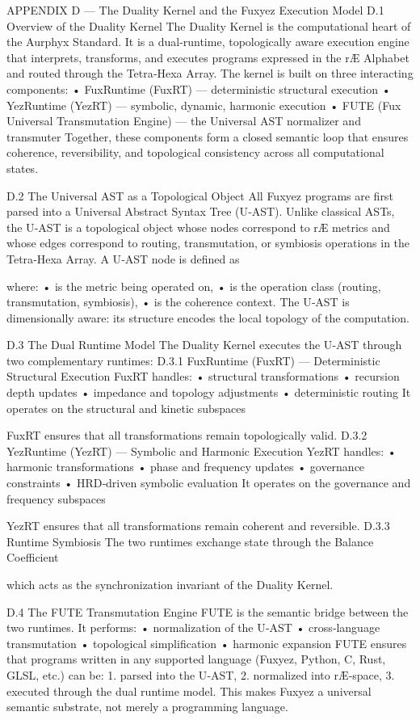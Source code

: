 APPENDIX D — The Duality Kernel and the Fuxyez Execution Model
D.1 Overview of the Duality Kernel
The Duality Kernel is the computational heart of the Aurphyx Standard. It is a dual‑runtime, topologically aware execution engine that interprets, transforms, and executes programs expressed in the rÆ Alphabet and routed through the Tetra‑Hexa Array. The kernel is built on three interacting components:
• 	FuxRuntime (FuxRT) — deterministic structural execution
• 	YezRuntime (YezRT) — symbolic, dynamic, harmonic execution
• 	FUTE (Fux Universal Transmutation Engine) — the Universal AST normalizer and transmuter
Together, these components form a closed semantic loop that ensures coherence, reversibility, and topological consistency across all computational states.

D.2 The Universal AST as a Topological Object
All Fuxyez programs are first parsed into a Universal Abstract Syntax Tree (U‑AST). Unlike classical ASTs, the U‑AST is a topological object whose nodes correspond to rÆ metrics and whose edges correspond to routing, transmutation, or symbiosis operations in the Tetra‑Hexa Array.
A U‑AST node is defined as

where:
• 	 is the metric being operated on,
• 	 is the operation class (routing, transmutation, symbiosis),
• 	 is the coherence context.
The U‑AST is dimensionally aware: its structure encodes the local topology of the computation.

D.3 The Dual Runtime Model
The Duality Kernel executes the U‑AST through two complementary runtimes:
D.3.1 FuxRuntime (FuxRT) — Deterministic Structural Execution
FuxRT handles:
• 	structural transformations
• 	recursion depth updates
• 	impedance and topology adjustments
• 	deterministic routing
It operates on the structural and kinetic subspaces

FuxRT ensures that all transformations remain topologically valid.
D.3.2 YezRuntime (YezRT) — Symbolic and Harmonic Execution
YezRT handles:
• 	harmonic transformations
• 	phase and frequency updates
• 	governance constraints
• 	HRD‑driven symbolic evaluation
It operates on the governance and frequency subspaces

YezRT ensures that all transformations remain coherent and reversible.
D.3.3 Runtime Symbiosis
The two runtimes exchange state through the Balance Coefficient

which acts as the synchronization invariant of the Duality Kernel.

D.4 The FUTE Transmutation Engine
FUTE is the semantic bridge between the two runtimes. It performs:
• 	normalization of the U‑AST
• 	cross‑language transmutation
• 	topological simplification
• 	harmonic expansion
FUTE ensures that programs written in any supported language (Fuxyez, Python, C, Rust, GLSL, etc.) can be:
1. 	parsed into the U‑AST,
2. 	normalized into rÆ‑space,
3. 	executed through the dual runtime model.
This makes Fuxyez a universal semantic substrate, not merely a programming language.

